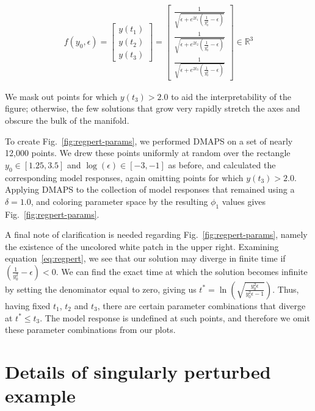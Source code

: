 \begin{align}
  f(y_0, \epsilon) = \begin{bmatrix} y(t_1) \\ y(t_2) \\
    y(t_3) \end{bmatrix} = \begin{bmatrix} \frac{1}{\sqrt{\epsilon + e^{2 t_1} \left(\frac{1}{y_0^2} -
  \epsilon \right)}} \\ 
\frac{1}{\sqrt{\epsilon + e^{2 t_2} \left(\frac{1}{y_0^2} -
      \epsilon \right)}} \\
\frac{1}{\sqrt{\epsilon + e^{2 t_3} \left(\frac{1}{y_0^2} -
      \epsilon \right)}}
\end{bmatrix} \in \mathbb{R}^3
\end{align}

We mask out points for which $y(t_3) > 2.0$ to aid the interpretability of
the figure; otherwise, the few solutions that grow very rapidly stretch
the axes and obscure the bulk of the manifold. 

To create Fig.~\ref{fig:regpert-params}, we performed DMAPS on a set
of nearly 12,000 points. We drew these points uniformly at random over
the rectangle $y_0 \in [1.25, 3.5]$ and $\log(\epsilon) \in [-3, -1]$
as before, and calculated the corresponding model responses, again
omitting points for which $y(t_3) > 2.0$. Applying DMAPS to the
collection of model responses that remained using a $\delta = 1.0$,
and coloring parameter space by the resulting $\phi_1$ values gives
Fig.~\ref{fig:regpert-params}.

A final note of clarification is needed regarding
Fig.~\ref{fig:regpert-params}, namely the existence of the uncolored
white patch in the upper right. Examining equation~\ref{eq:regpert},
we see that our solution may diverge in finite time if
$\left(\frac{1}{y_0^2} - \epsilon \right) < 0$. We can find the exact
time at which the solution becomes infinite by setting the denominator
equal to zero, giving us
$t^* = \ln \left( \sqrt{\frac{y_0^2 \epsilon}{y_0^2 \epsilon - 1}}
\right)$. Thus, having fixed $t_1$, $t_2$ and $t_3$, there are certain
parameter combinations that diverge at $t^* \le t_3$. The model
response is undefined at such points, and therefore we omit these
parameter combinations from our plots.


\section{Details of singularly perturbed example \label{app:singpert}}

